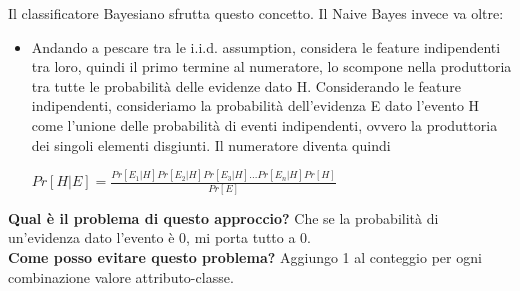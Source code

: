Il classificatore Bayesiano sfrutta questo concetto. Il Naive Bayes invece va oltre: 
\\
\begin{itemize}
    \item Andando a pescare tra le i.i.d. assumption, considera le feature indipendenti tra loro, quindi il primo termine al numeratore, lo scompone nella produttoria tra tutte le probabilità delle evidenze dato H. Considerando le feature indipendenti, consideriamo la probabilità dell'evidenza E dato l'evento H come l'unione delle probabilità di eventi indipendenti, ovvero la produttoria dei singoli elementi disgiunti. Il numeratore diventa quindi
    \begin{center}
        \begin{math}
            Pr[ H | E] = \frac{Pr[E_1 | H] Pr[E_2 | H] Pr[E_3 | H] ... Pr[E_n | H] Pr[H]}{Pr[E]}
        \end{math}
    \end{center}
\end{itemize}
\textbf{Qual è il problema di questo approccio?} Che se la probabilità di un'evidenza dato l'evento è 0, mi porta tutto a 0. 
\\
\textbf{Come posso evitare questo problema?} Aggiungo 1 al conteggio per ogni combinazione valore attributo-classe. 

\newpage

